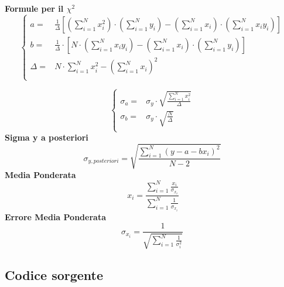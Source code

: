 \documentclass[a4paper,11pt,oneside]{article}
\begin{document}
\textbf{Formule per il ${\chi}^2$}
\begin{equation*}
        \begin{cases}
    a=&\frac{1}{\Delta}[(\sum\limits_{i=1}^{N}{x_{i}^{2}})\cdot(\sum\limits_{i=1}^{N}{y_{i}})-(\sum\limits_{i=1}^{N}{x_{i}})\cdot(\sum\limits_{i=1}^{N}{x_{i}y_{i}})] \\ 
    b=&\frac{1}{\Delta }\cdot \left [N\cdot \left ( \sum\limits_{i=1}^{N}x_i y_i \right )-\left ( \sum\limits_{i=1}^{N}x_i \right )\cdot \left ( \sum\limits_{i=1}^{N}y_i \right )  \right ]\\
    \Delta=& N\cdot \sum\limits_{i=1}^{N} x_i^{2} - \left ( \sum\limits_{i=1}^{N}x_i \right )^{2}\\

    \end{cases}
\end{equation*}

\begin{equation*}
    \begin{cases}
    \sigma_{a}=&\sigma_{y}\cdot\sqrt{\frac{\sum_{i=1}^{N}{x_{i}^{2}}}{\Delta}} \\
    \sigma_{b}=&\sigma_y\cdot \sqrt{\frac{N}{\Delta }}\\
    \end{cases}
\end{equation*}
\textbf{Sigma y a posteriori}
\begin{equation*}
    \sigma_{y, posteriori}=\sqrt{\frac{\sum_{i=1}^{N}(y-a-bx_{i})^{2}}{N-2}}\label{eq:y_posteriori}
\end{equation*}
\textbf{Media Ponderata}
\begin{equation*}\
    x_i=\frac{\sum_{i=1}^{N}\frac{x_i}{\sigma_{x_i}}}{\sum_{i=1}^{N}\frac{1}{\sigma_{x_i}}} \label{eq:media_ponderata}
\end{equation*}
\textbf{Errore Media Ponderata}
\begin{equation*}
     \sigma_{x_i}=\frac{1}{\sqrt{\sum_{i=1}^{N}\frac{1}{\sigma_{i}^{2}}}}\label{eq:errore_media_pond}
\end{equation*}
\subsection{Codice sorgente}
\end{document}
